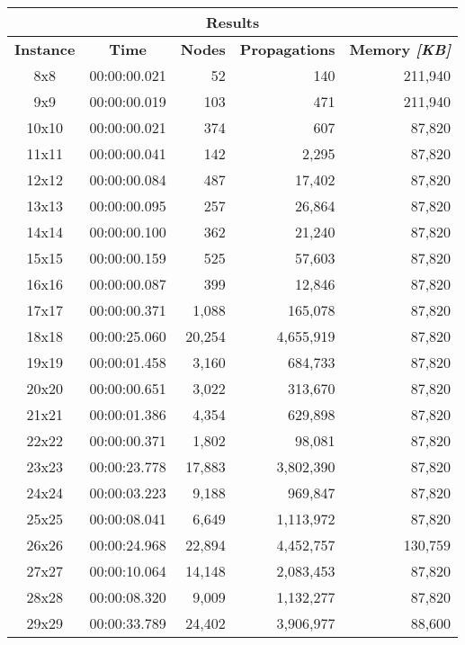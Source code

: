 
\begin{center}
    \begin{tabular}{|c|c|r|r|r|}
        \hline
        \multicolumn{5}{|c|}{\textbf{Results}} \\
        \hline
        \textbf{Instance} & \textbf{Time} & \textbf{Nodes} & \textbf{Propagations} & \textbf{Memory \textit{[KB]}} \\
        
        \hline
		8x8 & 00:00:00.021 & 52 & 140 & 211,940 \\ \hline
		9x9 & 00:00:00.019 & 103 & 471 & 211,940 \\ \hline
		10x10 & 00:00:00.021 & 374 & 607 & 87,820 \\ \hline
		11x11 & 00:00:00.041 & 142 & 2,295 & 87,820 \\ \hline
		12x12 & 00:00:00.084 & 487 & 17,402 & 87,820 \\ \hline
		13x13 & 00:00:00.095 & 257 & 26,864 & 87,820 \\ \hline
		14x14 & 00:00:00.100 & 362 & 21,240 & 87,820 \\ \hline
		15x15 & 00:00:00.159 & 525 & 57,603 & 87,820 \\ \hline
		16x16 & 00:00:00.087 & 399 & 12,846 & 87,820 \\ \hline
		17x17 & 00:00:00.371 & 1,088 & 165,078 & 87,820 \\ \hline
		18x18 & 00:00:25.060 & 20,254 & 4,655,919 & 87,820 \\ \hline
		19x19 & 00:00:01.458 & 3,160 & 684,733 & 87,820 \\ \hline
		20x20 & 00:00:00.651 & 3,022 & 313,670 & 87,820 \\ \hline
		21x21 & 00:00:01.386 & 4,354 & 629,898 & 87,820 \\ \hline
		22x22 & 00:00:00.371 & 1,802 & 98,081 & 87,820 \\ \hline
		23x23 & 00:00:23.778 & 17,883 & 3,802,390 & 87,820 \\ \hline
		24x24 & 00:00:03.223 & 9,188 & 969,847 & 87,820 \\ \hline
		25x25 & 00:00:08.041 & 6,649 & 1,113,972 & 87,820 \\ \hline
		26x26 & 00:00:24.968 & 22,894 & 4,452,757 & 130,759 \\ \hline
		27x27 & 00:00:10.064 & 14,148 & 2,083,453 & 87,820 \\ \hline
		28x28 & 00:00:08.320 & 9,009 & 1,132,277 & 87,820 \\ \hline
		29x29 & 00:00:33.789 & 24,402 & 3,906,977 & 88,600 \\ \hline

\end{tabular}
\end{center}
